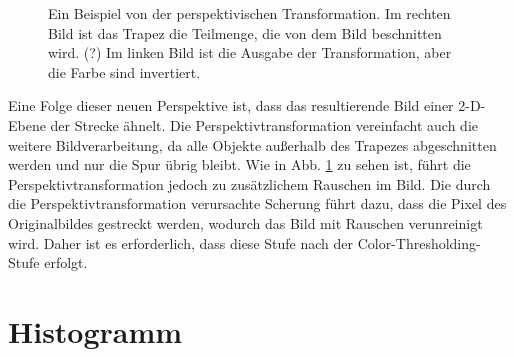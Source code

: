\documentclass[arbeit=studie,oneside,BCOR=12mm]{ArbeitRST}
\begin{document}
\begin{figure}[h]
    \centering
    \caption{Ein Beispiel von der perspektivischen Transformation. Im rechten Bild ist das Trapez
    die Teilmenge, die von dem Bild beschnitten wird. (?) Im linken Bild ist die Ausgabe der
    Transformation, aber die Farbe sind invertiert.}
    \label{roi-pt}
\end{figure}

Eine Folge dieser neuen Perspektive ist, dass das resultierende Bild einer
2-D-Ebene der Strecke ähnelt. Die Perspektivtransformation vereinfacht auch die
weitere Bildverarbeitung, da alle Objekte außerhalb des Trapezes abgeschnitten
werden und nur die Spur übrig bleibt. Wie in Abb. \ref{roi-pt} zu sehen ist, führt die
Perspektivtransformation jedoch zu zusätzlichem Rauschen im Bild. Die durch die
Perspektivtransformation verursachte Scherung führt dazu, dass die Pixel des
Originalbildes gestreckt werden, wodurch das Bild mit Rauschen verunreinigt
wird. Daher ist es erforderlich, dass diese Stufe nach der
\glqq Color-Thresholding\grqq-Stufe erfolgt.

\section{Histogramm}
\end{document}
